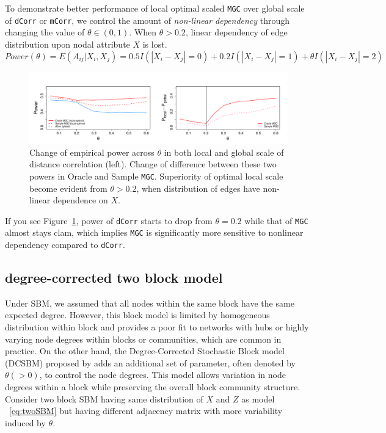 \documentclass[12pt]{article}
\theoremstyle{definition}
\begin{document}
 To demonstrate better performance of local optimal scaled \texttt{MGC} over global scale of \texttt{dCorr} or \texttt{mCorr}, we control the amount of \textit{non-linear dependency} through changing the value of $\theta \in (0, 1)$. When $\theta > 0.2$, linear dependency of edge distribution upon nodal attribute $X$ is lost.
\begin{equation}
Power(\theta) = E(A_{ij} | X_{i}, X_{j}) = 0.5 I(|X_{i} - X_{j}| = 0) + 0.2 I(|X_{i} - X_{j}| = 1) + \theta I(|X_{i} - X_{j}| = 2)
\end{equation}

\begin{figure}[H]
	\centering
	\includegraphics[width=6in]{../Figure/powerplot.pdf}
	\caption{Change of empirical power across $\theta$ in both local and global scale of distance correlation (left). Change of difference between these two powers in Oracle and Sample \texttt{MGC}. Superiority of optimal local scale become evident from $\theta > 0.2$, when distribution of edges have non-linear dependence on $X$.}
	\label{fig:powerplot}
\end{figure}
If you see Figure~\ref{fig:powerplot}, power of \texttt{dCorr} starts to drop from $\theta = 0.2$ while that of \texttt{MGC} almost stays clam, which implies \texttt{MGC} is significantly more sensitive to nonlinear dependency compared to \texttt{dCorr}.

\subsection{degree-corrected two block model}

Under SBM, we assumed that all nodes within the same block have the same expected degree. However, this block model is limited by homogeneous distribution within block and provides a poor fit to networks with hubs or highly varying node degrees within blocks or communities, which are common in practice. On the other hand, the Degree-Corrected Stochastic Block model (DCSBM) proposed by \cite{karrer2011stochastic} adds an additional set of parameter, often denoted by $\theta (>0)$, to control the node degrees. This model allows variation in node degrees within a block while preserving the overall block community structure. Consider two block SBM having same distribution of $X$ and $Z$ as model ~\ref{eq:twoSBM} but having different adjacency matrix with more variability induced by $\theta$.
\end{document}
